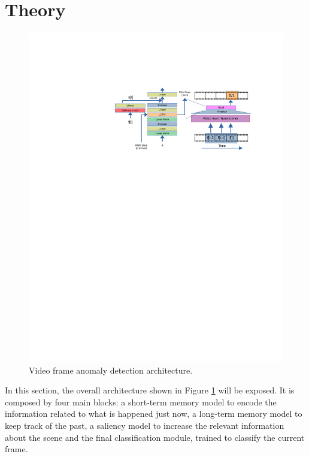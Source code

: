 \section{Theory}
\fboxsep=1mm%
\fboxrule=1pt%

\begin{figure}[t]
    \centering
        \includegraphics[trim=120 500 0 130, clip, width=1.\linewidth]{images/arch.pdf}
    \caption{Video frame anomaly detection architecture.}
    \label{fig:arch}
\end{figure}

In this section, the overall architecture shown in Figure \ref{fig:arch} will be exposed.
It is composed by four main blocks: a short-term memory model to encode the information related to what is happened just now, a long-term memory model to keep track of the past, a saliency model to increase the relevant information about the scene and the final classification module, trained to classify the current frame.

